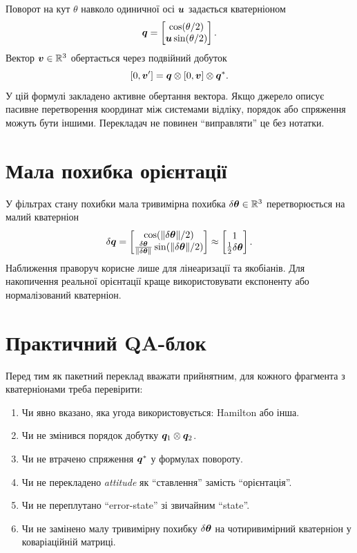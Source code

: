 Поворот на кут $\theta$ навколо одиничної осі $\bm{u}$ задається кватерніоном
\begin{equation}\label{eq:unit_quat_axis_angle}
\bm{q}=\begin{bmatrix}\cos(\theta/2)\\ \bm{u}\sin(\theta/2)\end{bmatrix}.
\end{equation}
Вектор $\bm{v}\in\mathbb{R}^3$ обертається через подвійний добуток
\begin{equation}\label{eq:quat_rotate_vector}
[0,\bm{v}'] = \bm{q}\otimes[0,\bm{v}]\otimes\bm{q}^*.
\end{equation}
У цій формулі закладено активне обертання вектора. Якщо джерело описує пасивне перетворення координат між системами відліку, порядок або спряження можуть бути іншими. Перекладач не повинен ``виправляти'' це без нотатки.

\section{Мала похибка орієнтації}

У фільтрах стану похибки мала тривимірна похибка $\delta\bm{\theta}\in\mathbb{R}^3$ перетворюється на малий кватерніон
\begin{equation}\label{eq:small_error_quat}
\delta\bm{q}
=\begin{bmatrix}
\cos(\|\delta\bm{\theta}\|/2)\\
\frac{\delta\bm{\theta}}{\|\delta\bm{\theta}\|}\sin(\|\delta\bm{\theta}\|/2)
\end{bmatrix}
\approx
\begin{bmatrix}
1\\ \frac{1}{2}\delta\bm{\theta}
\end{bmatrix}.
\end{equation}
Наближення праворуч корисне лише для лінеаризації та якобіанів. Для накопичення реальної орієнтації краще використовувати експоненту або нормалізований кватерніон.

\section{Практичний QA-блок}

Перед тим як пакетний переклад вважати прийнятним, для кожного фрагмента з кватерніонами треба перевірити:
\begin{enumerate}[leftmargin=2em]
\item Чи явно вказано, яка угода використовується: Hamilton або інша.
\item Чи не змінився порядок добутку $\bm{q}_1\otimes\bm{q}_2$.
\item Чи не втрачено спряження $\bm{q}^*$ у формулах повороту.
\item Чи не перекладено \emph{attitude} як ``ставлення'' замість ``орієнтація''.
\item Чи не переплутано ``error-state'' зі звичайним ``state''.
\item Чи не замінено малу тривимірну похибку $\delta\bm{\theta}$ на чотиривимірний кватерніон у коваріаційній матриці.
\end{enumerate}

